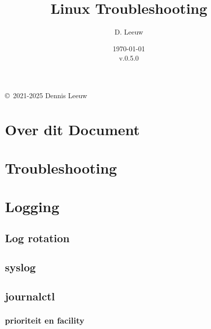 \documentclass[a4paper,12pt,twoside,openright,titlepage]{book}
\author{D. Leeuw}
\title{Linux Troubleshooting}
\date{\today\\v.0.5.0}
\begin{document}

\maketitle

\copyright\ 2021-2025 Dennis Leeuw\\




\frontmatter
\chapter{Over dit Document}
%
%

\tableofcontents

\mainmatter

\chapter{Troubleshooting}


\chapter{Logging}

\section{Log rotation}\label{sec:logrotate}

\section{syslog}\label{sec:syslog}


\section{journalctl}\label{sec:journalctl}

\subsection{prioriteit en facility}\label{sec:journalctl-prio_fac}


\printindex
\end{document}
